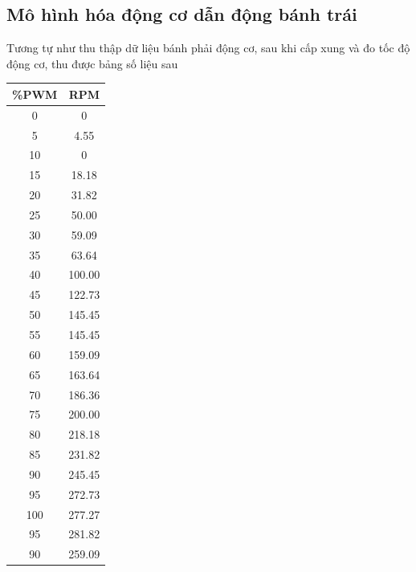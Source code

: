           \subsection{Mô hình hóa động cơ dẫn động bánh trái}
               \hspace*{0.6cm}Tương tự như thu thập dữ liệu bánh phải động cơ, sau khi cấp xung và đo tốc độ động cơ, thu được bảng số liệu sau
               \begin{table}[h!]
                    \centering
                    \begin{tabular}{|c|c|}
                         \hline
                         \textbf{\%PWM} & \textbf{RPM} \\
                         \hline
                         0   & 0 \\
                         5   & 4.55 \\
                         10  & 0 \\
                         15  & 18.18 \\
                         20  & 31.82 \\
                         25  & 50.00 \\
                         30  & 59.09 \\
                         35  & 63.64 \\
                         40  & 100.00 \\
                         45  & 122.73 \\
                         50  & 145.45 \\
                         55  & 145.45 \\
                         60  & 159.09 \\
                         65  & 163.64 \\
                         70  & 186.36 \\
                         75  & 200.00 \\
                         80  & 218.18 \\
                         85  & 231.82 \\
                         90  & 245.45 \\
                         95  & 272.73 \\
                         100 & 277.27 \\
                         95  & 281.82 \\
                         90  & 259.09 \\

\end{tabular}
\end{table}
